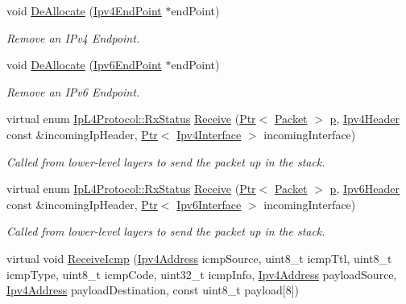 \begin{DoxyCompactItemize}
void \hyperlink{classns3_1_1TcpL4Protocol_ab538121d6641110ce20e68e9e4ab5fce}{De\+Allocate} (\hyperlink{classns3_1_1Ipv4EndPoint}{Ipv4\+End\+Point} $\ast$end\+Point)
\begin{DoxyCompactList}\small\item\em Remove an I\+Pv4 Endpoint. \end{DoxyCompactList}\item 
void \hyperlink{classns3_1_1TcpL4Protocol_aa0b65ccf2bd4f41738446f1990f97bbf}{De\+Allocate} (\hyperlink{classns3_1_1Ipv6EndPoint}{Ipv6\+End\+Point} $\ast$end\+Point)
\begin{DoxyCompactList}\small\item\em Remove an I\+Pv6 Endpoint. \end{DoxyCompactList}\item 
virtual enum \hyperlink{classns3_1_1IpL4Protocol_afd3744c89902fff232e2fd45f558c80e}{Ip\+L4\+Protocol\+::\+Rx\+Status} \hyperlink{classns3_1_1TcpL4Protocol_a73a9498522829954684a7b4fabd6bf3e}{Receive} (\hyperlink{classns3_1_1Ptr}{Ptr}$<$ \hyperlink{classns3_1_1Packet}{Packet} $>$ \hyperlink{lte__link__budget__x2__handover__measures_8m_ac9de518908a968428863f829398a4e62}{p}, \hyperlink{classns3_1_1Ipv4Header}{Ipv4\+Header} const \&incoming\+Ip\+Header, \hyperlink{classns3_1_1Ptr}{Ptr}$<$ \hyperlink{classns3_1_1Ipv4Interface}{Ipv4\+Interface} $>$ incoming\+Interface)
\begin{DoxyCompactList}\small\item\em Called from lower-\/level layers to send the packet up in the stack. \end{DoxyCompactList}\item 
virtual enum \hyperlink{classns3_1_1IpL4Protocol_afd3744c89902fff232e2fd45f558c80e}{Ip\+L4\+Protocol\+::\+Rx\+Status} \hyperlink{classns3_1_1TcpL4Protocol_a47f392dce81978c0c2f3e7b46d1a9024}{Receive} (\hyperlink{classns3_1_1Ptr}{Ptr}$<$ \hyperlink{classns3_1_1Packet}{Packet} $>$ \hyperlink{lte__link__budget__x2__handover__measures_8m_ac9de518908a968428863f829398a4e62}{p}, \hyperlink{classns3_1_1Ipv6Header}{Ipv6\+Header} const \&incoming\+Ip\+Header, \hyperlink{classns3_1_1Ptr}{Ptr}$<$ \hyperlink{classns3_1_1Ipv6Interface}{Ipv6\+Interface} $>$ incoming\+Interface)
\begin{DoxyCompactList}\small\item\em Called from lower-\/level layers to send the packet up in the stack. \end{DoxyCompactList}\item 
virtual void \hyperlink{classns3_1_1TcpL4Protocol_aa78a842105c7a60f09eda4a0980c7458}{Receive\+Icmp} (\hyperlink{classns3_1_1Ipv4Address}{Ipv4\+Address} icmp\+Source, uint8\+\_\+t icmp\+Ttl, uint8\+\_\+t icmp\+Type, uint8\+\_\+t icmp\+Code, uint32\+\_\+t icmp\+Info, \hyperlink{classns3_1_1Ipv4Address}{Ipv4\+Address} payload\+Source, \hyperlink{classns3_1_1Ipv4Address}{Ipv4\+Address} payload\+Destination, const uint8\+\_\+t payload\mbox{[}8\mbox{]})

\end{DoxyCompactItemize}

